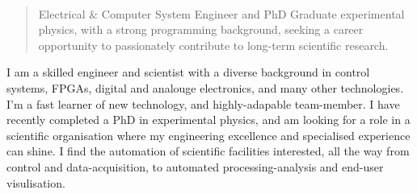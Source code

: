 \documentclass[10pt,a4paper,ragged2e,withhyper]{altacv}
\begin{document}
\begin{paracol}{2}
       
        
            \\

            \vspace{-0.5em}
        
        \switchcolumn
        
        \vspace{-0.2em}
            \begin{quote}
            	Electrical \& Computer System Engineer and PhD Graduate experimental physics, with a strong programming background, seeking a career opportunity to passionately contribute to long-term scientific research.
            \end{quote}
        \vspace{0.5em}
		I am a skilled engineer and scientist with a diverse background in control systems, FPGAs, digital and analouge electronics, and many other technologies. I'm a fast learner of new technology, and highly-adapable team-member. 
		I have recently completed a PhD in experimental physics, and am looking for a role in a scientific organisation where my engineering excellence and specialised experience can shine.
		I find the automation of scientific facilities interested, all the way from control and data-acquisition, to automated processing-analysis and end-user visulisation.

        

\end{paracol}
\end{document}
